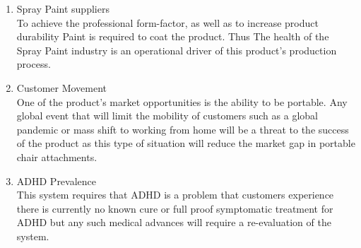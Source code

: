 \begin{enumerate}
        \item Spray Paint suppliers \\
          To achieve the professional form-factor, as well as to increase
          product durability Paint is required to coat the product. Thus The
          health of the Spray Paint industry is an operational driver of this
          product's production process.
        \item Customer Movement \\
          One of the product's market opportunities is the ability to be
          portable. Any global event that will limit the mobility of
          customers such as a global pandemic or mass shift to working from home
          will be a threat to the success of the product as this type of
          situation will reduce the market gap in portable chair attachments.
        \item ADHD Prevalence \\
          This system requires that ADHD is a problem that customers experience
          there is currently no known cure or full proof symptomatic
          treatment for ADHD but any such medical advances will require a
          re-evaluation of the system.
      \end{enumerate} 

